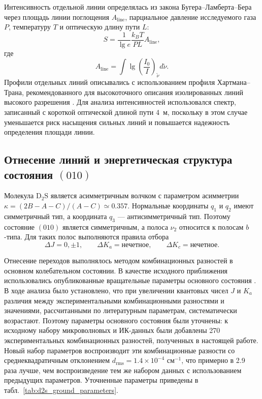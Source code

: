 Интенсивность отдельной линии определялась из закона Бугера--Ламберта--Бера через площадь линии
поглощения $A_{\text{line}}$, парциальное давление исследуемого газа $P$, температуру $T$ и оптическую
длину пути $L$:
\begin{equation}
S=\frac{1}{\lg e}\frac{k_B T}{PL}A_{\text{line}},
\label{eq:d2s_beer_lambert}
\end{equation}
где
\begin{equation}
A_{\text{line}}=\int \lg\left(\frac{I_0}{I}\right)_{\widetilde{\nu}}d\widetilde{\nu}.
\label{eq:d2s_line_area}
\end{equation}
Профили отдельных линий описывались с использованием профиля Хартмана--Трана, рекомендованного для
высокоточного описания изолированных линий высокого разрешения \cite{d2s_tennyson2014}. Для анализа
интенсивностей использовался спектр, записанный с короткой оптической длиной пути 4~м, поскольку в
этом случае уменьшается риск насыщения сильных линий и повышается надежность определения площади
линии.

\subsection{Отнесение линий и энергетическая структура состояния $(010)$}

Молекула D$_2$S является асимметричным волчком с параметром асимметрии
$\kappa=(2B-A-C)/(A-C)\simeq0.357$. Нормальные координаты $q_1$ и $q_2$ имеют симметричный тип, а
координата $q_3$ --- антисимметричный тип. Поэтому состояние $(010)$ является симметричным, а полоса
$\nu_2$ относится к полосам $b$-типа. Для таких полос выполняются правила отбора
\begin{equation}
\Delta J=0,\pm1,\qquad \Delta K_a=\text{нечетное},\qquad \Delta K_c=\text{нечетное}.
\label{eq:d2s_selection_rules}
\end{equation}

Отнесение переходов выполнялось методом комбинационных разностей в основном колебательном состоянии.
В качестве исходного приближения использовались опубликованные вращательные параметры основного
состояния \cite{d2s_camy1985}. В ходе анализа было установлено, что при увеличении квантовых чисел
$J$ и $K_a$ различия между экспериментальными комбинационными разностями и значениями, рассчитанными
по литературным параметрам, систематически возрастают. Поэтому параметры основного состояния были
уточнены: к исходному набору микроволновых и ИК-данных были добавлены 270 экспериментальных
комбинационных разностей, полученных в настоящей работе. Новый набор параметров воспроизводит эти
комбинационные разности со среднеквадратичным отклонением $d_{\textrm{rms}}=1.4\times10^{-4}$
см$^{-1}$, что примерно в 2.9 раза лучше, чем воспроизведение тем же набором данных с использованием
предыдущих параметров. Уточненные параметры приведены в табл.~\ref{tab:d2s_ground_parameters}.


